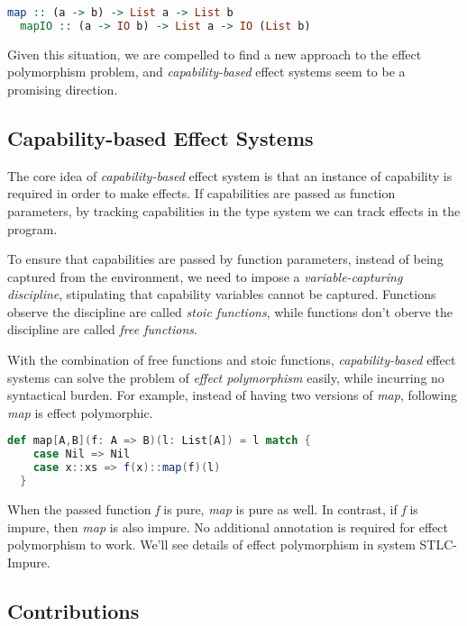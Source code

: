 \begin{lstlisting}[language=Haskell]
  map :: (a -> b) -> List a -> List b
  mapIO :: (a -> IO b) -> List a -> IO (List b)
\end{lstlisting}

Given this situation, we are compelled to find a new approach to the
effect polymorphism problem, and \emph{capability-based} effect
systems seem to be a promising direction.

\subsection{Capability-based Effect Systems}

The core idea of \emph{capability-based} effect system is that an
instance of capability is required in order to make effects. If
capabilities are passed as function parameters, by tracking
capabilities in the type system we can track effects in the program.

To ensure that capabilities are passed by function parameters, instead
of being captured from the environment, we need to impose a
\emph{variable-capturing discipline}, stipulating that capability
variables cannot be captured. Functions observe the discipline are
called \emph{stoic functions}, while functions don't oberve the
discipline are called \emph{free functions}.

With the combination of free functions and stoic functions,
\emph{capability-based} effect systems can solve the problem of
\emph{effect polymorphism} easily, while incurring no syntactical
burden. For example, instead of having two versions of \emph{map},
following \emph{map} is effect polymorphic.

\begin{lstlisting}[language=Scala]
  def map[A,B](f: A => B)(l: List[A]) = l match {
    case Nil => Nil
    case x::xs => f(x)::map(f)(l)
  }
\end{lstlisting}

When the passed function \emph{f} is pure, \emph{map} is pure as
well. In contrast, if \emph{f} is impure, then \emph{map} is also
impure. No additional annotation is required for effect polymorphism
to work. We'll see details of effect polymorphism in system
STLC-Impure.

\subsection{Contributions}

